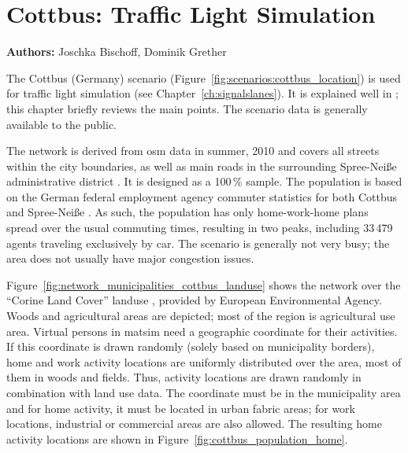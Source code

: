 \section{Cottbus: Traffic Light Simulation}
\label{ch:scenarios:cottbus}
\hfill \textbf{Authors:} Joschka Bischoff, Dominik Grether


The Cottbus (Germany) scenario (Figure~\ref{fig:scenarios:cottbus_location}) is used for traffic light simulation (see Chapter~\ref{ch:signalslanes}). 
It is explained well in \citet[][pp.~87]{Grether_PhDThesis_2014}; this chapter briefly reviews the main points. 
The scenario data is generally available to the public.

The network is derived from \gls{osm} data in summer, 2010 \citep{Bischoff2010BaSylvia} and 
covers all streets within the city boundaries, as well as main roads in the surrounding Spree-Neiße administrative district . 
It is designed as a 100\,\% sample. 
The population is based on the German federal employment agency commuter statistics for both Cottbus and Spree-Neiße \citep{WiethoelterBogaiCarstensen2010IABPendlerberichtBB}. 
As such, the population has only home-work-home plans spread over the usual commuting times, resulting in two peaks, including 
33\,479 agents traveling exclusively by car. 
The scenario is generally not very busy; the area does not usually have major congestion issues.

Figure~\ref{fig:network_municipalities_cottbus_landuse} shows the network over the 
``Corine Land Cover'' landuse \citep{CorineLandCover2006Data}, provided by European Environmental Agency. 
Woods and agricultural areas are depicted; most of the region is agricultural use area.  
Virtual persons in \gls{matsim} need a geographic coordinate for their activities. 
If this coordinate is drawn randomly (solely based on municipality borders), home and work activity locations are uniformly distributed over  the area, \ie most of them in woods and fields. 
Thus, activity locations are drawn randomly in combination with land use data. 
The coordinate must be in the municipality area and for home activity, it must be located in urban fabric areas; for work locations, industrial or commercial areas are also allowed. 
The resulting home activity locations are shown in Figure~\ref{fig:cottbus_population_home}. 

